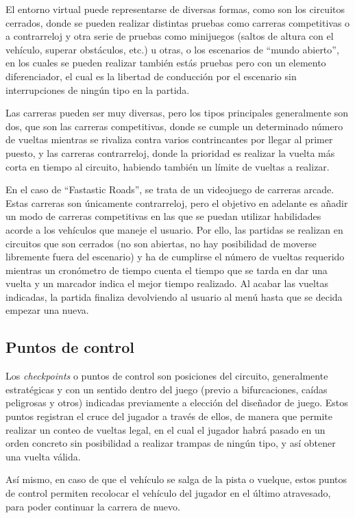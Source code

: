 El entorno virtual puede representarse de diversas formas, como son los circuitos cerrados, donde se pueden realizar distintas pruebas como carreras competitivas o a contrarreloj y otra serie de pruebas como minijuegos (saltos de altura con el vehículo, superar obstáculos, etc.) u otras, o los escenarios de ``mundo abierto'', en los cuales se pueden realizar también estás pruebas pero con un elemento diferenciador, el cual es la libertad de conducción por el escenario sin interrupciones de ningún tipo en la partida.

Las carreras pueden ser muy diversas, pero los tipos principales generalmente son dos, que son las carreras competitivas, donde se cumple un determinado número de vueltas mientras se rivaliza contra varios contrincantes por llegar al primer puesto, y las carreras contrarreloj, donde la prioridad es realizar la vuelta más corta en tiempo al circuito, habiendo también un límite de vueltas a realizar.

En el caso de ``Fastastic Roads'', se trata de un videojuego de carreras arcade. Estas carreras son únicamente contrarreloj, pero el objetivo en adelante es añadir un modo de carreras competitivas en las que se puedan utilizar habilidades acorde a los vehículos que maneje el usuario. Por ello, las partidas se realizan en circuitos que son cerrados (no son abiertas, no hay posibilidad de moverse libremente fuera del escenario) y ha de cumplirse el número de vueltas requerido mientras un cronómetro de tiempo cuenta el tiempo que se tarda en dar una vuelta y un marcador indica el mejor tiempo realizado. Al acabar las vueltas indicadas, la partida finaliza devolviendo al usuario al menú hasta que se decida empezar una nueva.

\subsection{Puntos de control}

Los \textit{checkpoints} o puntos de control son posiciones del circuito, generalmente estratégicas y con un sentido dentro del juego (previo a bifurcaciones, caídas peligrosas y otros) indicadas previamente a elección del diseñador de juego. Estos puntos registran el cruce del jugador a través de ellos, de manera que permite realizar un conteo de vueltas legal, en el cual el jugador habrá pasado en un orden concreto sin posibilidad a realizar trampas de ningún tipo, y así obtener una vuelta válida.

Así mismo, en caso de que el vehículo se salga de la pista o vuelque, estos puntos de control permiten recolocar el vehículo del jugador en el último atravesado, para poder continuar la carrera de nuevo.